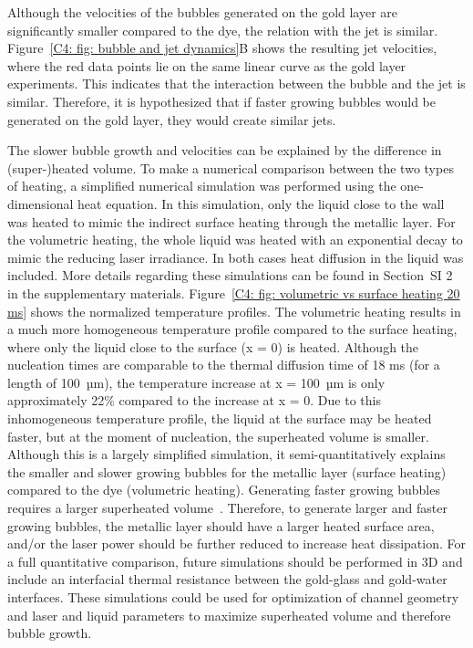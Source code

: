 \documentclass[11pt]{article}
\begin{document}
Although the velocities of the bubbles generated on the gold layer are significantly smaller compared to the dye, the relation with the jet is similar. Figure~\ref{C4: fig: bubble and jet dynamics}B shows the resulting jet velocities, where the red data points lie on the same linear curve as the gold layer experiments. This indicates that the interaction between the bubble and the jet is similar. Therefore, it is hypothesized that if faster growing bubbles would be generated on the gold layer, they would create similar jets.

The slower bubble growth and velocities can be explained by the difference in (super-)heated volume. To make a numerical comparison between the two types of heating, a simplified numerical simulation was performed using the one-dimensional heat equation. In this simulation, only the liquid close to the wall was heated to mimic the indirect surface heating through the metallic layer. For the volumetric heating, the whole liquid was heated with an exponential decay to mimic the reducing laser irradiance. In both cases heat diffusion in the liquid was included. More details regarding these simulations can be found in Section~SI 2 in the supplementary materials. 
Figure~\ref{C4: fig: volumetric vs surface heating 20 ms} shows the normalized temperature profiles. The volumetric heating results in a much more homogeneous temperature profile compared to the surface heating, where only the liquid close to the surface (x = 0) is heated. Although the nucleation times are comparable to the thermal diffusion time of 18 ms (for a length of 100~µm), the temperature increase at x = 100~µm is only approximately 22\% compared to the increase at x = 0. Due to this inhomogeneous temperature profile, the liquid at the surface may be heated faster, but at the moment of nucleation, the superheated volume is smaller. Although this is a largely simplified simulation, it semi-quantitatively explains the smaller and slower growing bubbles for the metallic layer (surface heating) compared to the dye (volumetric heating). Generating faster growing bubbles requires a larger superheated volume~\cite{Schoppink2024}. Therefore, to generate larger and faster growing bubbles, the metallic layer should have a larger heated surface area, and/or the laser power should be further reduced to increase heat dissipation. For a full quantitative comparison, future simulations should be performed in 3D and include an interfacial thermal resistance between the gold-glass and gold-water interfaces.  These simulations could be used for optimization of channel geometry and laser and liquid parameters to maximize superheated volume and therefore bubble growth.
\end{document}
